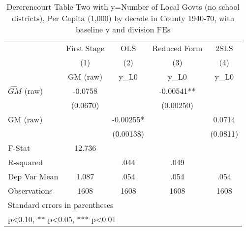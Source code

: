 \begin{table}[htbp]\centering
\def\sym#1{\ifmmode^{#1}\else\(^{#1}\)\fi}
\caption{Dererencourt Table Two with y=Number of Local Govts (no school districts), Per Capita (1,000) by decade in County 1940-70, with baseline y and division FEs}
\begin{tabular}{l*{4}{c}}
\toprule
                    & First Stage   &         OLS   &Reduced Form   &        2SLS   \\
                    &\multicolumn{1}{c}{(1)}&\multicolumn{1}{c}{(2)}&\multicolumn{1}{c}{(3)}&\multicolumn{1}{c}{(4)}\\
                    &\multicolumn{1}{c}{GM  (raw)}&\multicolumn{1}{c}{y\_L0}&\multicolumn{1}{c}{y\_L0}&\multicolumn{1}{c}{y\_L0}\\
\midrule
$\hat{GM}$ (raw)    &     -0.0758   &               &    -0.00541** &               \\
                    &    (0.0670)   &               &   (0.00250)   &               \\
\addlinespace
GM  (raw)           &               &    -0.00255*  &               &      0.0714   \\
                    &               &   (0.00138)   &               &    (0.0811)   \\
\midrule
F-Stat              &      12.736   &               &               &               \\
R-squared           &               &        .044   &        .049   &               \\
Dep Var Mean        &       1.087   &        .054   &        .054   &        .054   \\
Observations        &        1608   &        1608   &        1608   &        1608   \\
\bottomrule
\multicolumn{5}{l}{\footnotesize Standard errors in parentheses}\\
\multicolumn{5}{l}{\footnotesize * p<0.10, ** p<0.05, *** p<0.01}\\
\end{tabular}
\end{table}
